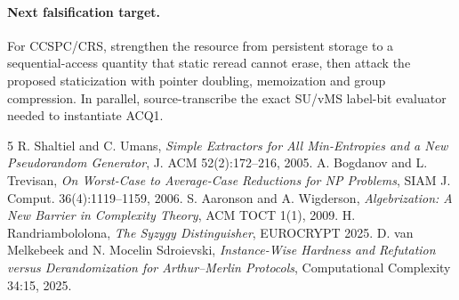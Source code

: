 \documentclass[11pt]{article}
\begin{document}
\paragraph{Next falsification target.} For CCSPC/CRS, strengthen the resource from persistent storage to a sequential-access quantity that static reread cannot erase, then attack the proposed staticization with pointer doubling, memoization and group compression. In parallel, source-transcribe the exact SU/vMS label-bit evaluator needed to instantiate ACQ1.

\begin{thebibliography}{5}
 R. Shaltiel and C. Umans, \emph{Simple Extractors for All Min-Entropies and a New Pseudorandom Generator}, J. ACM 52(2):172--216, 2005.
 A. Bogdanov and L. Trevisan, \emph{On Worst-Case to Average-Case Reductions for NP Problems}, SIAM J. Comput. 36(4):1119--1159, 2006.
 S. Aaronson and A. Wigderson, \emph{Algebrization: A New Barrier in Complexity Theory}, ACM TOCT 1(1), 2009.
 H. Randriambololona, \emph{The Syzygy Distinguisher}, EUROCRYPT 2025.
 D. van Melkebeek and N. Mocelin Sdroievski, \emph{Instance-Wise Hardness and Refutation versus Derandomization for Arthur--Merlin Protocols}, Computational Complexity 34:15, 2025.
\end{thebibliography}
\end{document}
